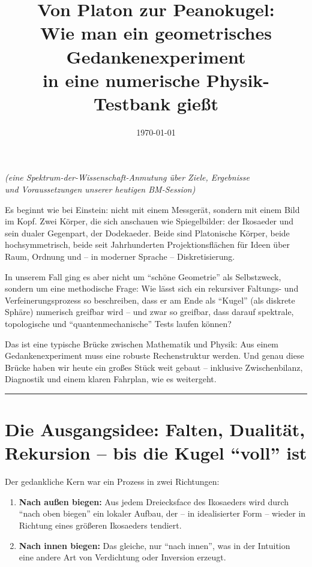 \documentclass[11pt,a4paper]{article}
\title{\textbf{Von Platon zur Peanokugel:}\\
\large Wie man ein geometrisches Gedankenexperiment\\
in eine numerische Physik-Testbank gießt}
\author{}
\date{\today}
\begin{document}
\maketitle

\vspace{1em}

\begin{center}
\small
\textit{(eine Spektrum-der-Wissenschaft-Anmutung über Ziele, Ergebnisse\\
und Voraussetzungen unserer heutigen BM-Session)}
\end{center}

\vspace{2em}

\noindent Es beginnt wie bei Einstein: nicht mit einem Messgerät, sondern mit einem Bild im Kopf. Zwei Körper, die sich anschauen wie Spiegelbilder: der Ikosaeder und sein dualer Gegenpart, der Dodekaeder. Beide sind Platonische Körper, beide hochsymmetrisch, beide seit Jahrhunderten Projektionsflächen für Ideen über Raum, Ordnung und -- in moderner Sprache -- Diskretisierung.

In unserem Fall ging es aber nicht um ``schöne Geometrie'' als Selbstzweck, sondern um eine methodische Frage: Wie lässt sich ein rekursiver Faltungs- und Verfeinerungsprozess so beschreiben, dass er am Ende als ``Kugel'' (als diskrete Sphäre) numerisch greifbar wird -- und zwar so greifbar, dass darauf spektrale, topologische und ``quantenmechanische'' Tests laufen können?

Das ist eine typische Brücke zwischen Mathematik und Physik: Aus einem Gedankenexperiment muss eine robuste Rechenstruktur werden. Und genau diese Brücke haben wir heute ein großes Stück weit gebaut -- inklusive Zwischenbilanz, Diagnostik und einem klaren Fahrplan, wie es weitergeht.

\vspace{1.5em}
\begin{center}
\rule{0.3\textwidth}{0.4pt}
\end{center}
\vspace{1.5em}

\section{Die Ausgangsidee: Falten, Dualität, Rekursion -- bis die Kugel ``voll'' ist}

Der gedankliche Kern war ein Prozess in zwei Richtungen:
\begin{enumerate}[leftmargin=*,itemsep=0.5em]
    \item \textbf{Nach außen biegen:} Aus jedem Dreiecksface des Ikosaeders wird durch ``nach oben biegen'' ein lokaler Aufbau, der -- in idealisierter Form -- wieder in Richtung eines größeren Ikosaeders tendiert.
    \item \textbf{Nach innen biegen:} Das gleiche, nur ``nach innen'', was in der Intuition eine andere Art von Verdichtung oder Inversion erzeugt.
\end{enumerate}
\end{document}
